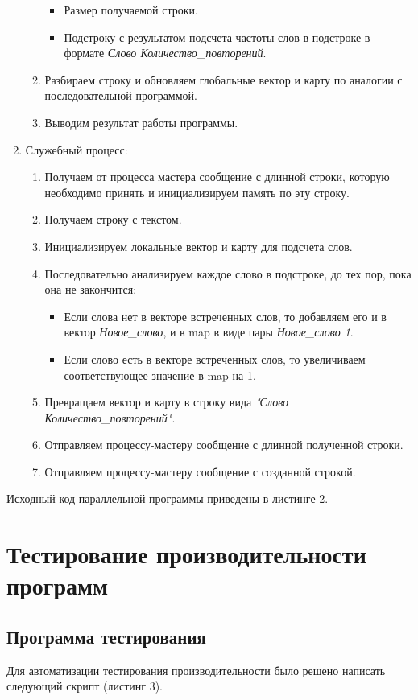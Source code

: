 \documentclass[12pt,a4paper]{report}
\begin{document}
\begin{enumerate}
\begin{enumerate}
\begin{itemize}
										\item Размер получаемой строки.
										\item Подстроку с результатом подсчета частоты слов в подстроке в формате \textit{Слово Количество\_повторений}.
									\end{itemize}
								\item Разбираем строку и обновляем глобальные вектор и карту по аналогии с последовательной программой.
								\item Выводим результат работы программы.
							\end{enumerate}
						\item Служебный процесс:
							\begin{enumerate}
								\item Получаем от процесса мастера сообщение с длинной строки, которую необходимо принять и инициализируем память по эту строку.
								\item Получаем строку с текстом.
								\item Инициализируем локальные вектор и карту для подсчета слов.
								\item Последовательно анализируем каждое слово в подстроке, до тех пор, пока она не закончится:
									\begin{itemize}
										\item Если слова нет в векторе встреченных слов, то добавляем его и в вектор \textit{Новое\_слово}, и в map в виде пары \textit{Новое\_слово 1}.
										\item Если слово есть в векторе встреченных слов, то увеличиваем соответствующее значение в map на 1.
									\end{itemize}
								\item Превращаем вектор и карту в строку вида \textit{"Слово Количество\_повторений"}.
								\item Отправляем процессу-мастеру сообщение с длинной полученной строки.
								\item Отправляем процессу-мастеру сообщение с созданной строкой.
							\end{enumerate}
					\end{enumerate}
				
				Исходный код параллельной программы приведены в листинге 2.
				
		\section{Тестирование производительности программ}
			\subsection{Программа тестирования}
				Для автоматизации тестирования производительности было решено написать 
				следующий скрипт (листинг 3).
				
\end{document}
